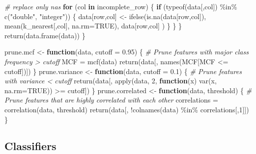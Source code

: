 \documentclass[
]{article}
\newenvironment{Shaded}{\begin{snugshade}}{\end{snugshade}}
\newcommand{\AttributeTok}[1]{\textcolor[rgb]{0.77,0.63,0.00}{#1}}
\newcommand{\CommentTok}[1]{\textcolor[rgb]{0.56,0.35,0.01}{\textit{#1}}}
\newcommand{\ConstantTok}[1]{\textcolor[rgb]{0.00,0.00,0.00}{#1}}
\newcommand{\ControlFlowTok}[1]{\textcolor[rgb]{0.13,0.29,0.53}{\textbf{#1}}}
\newcommand{\DecValTok}[1]{\textcolor[rgb]{0.00,0.00,0.81}{#1}}
\newcommand{\FloatTok}[1]{\textcolor[rgb]{0.00,0.00,0.81}{#1}}
\newcommand{\FunctionTok}[1]{\textcolor[rgb]{0.00,0.00,0.00}{#1}}
\newcommand{\NormalTok}[1]{#1}
\newcommand{\OtherTok}[1]{\textcolor[rgb]{0.56,0.35,0.01}{#1}}
\newcommand{\SpecialCharTok}[1]{\textcolor[rgb]{0.00,0.00,0.00}{#1}}
\newcommand{\StringTok}[1]{\textcolor[rgb]{0.31,0.60,0.02}{#1}}
\begin{document}
\begin{Shaded}
\begin{Highlighting}[]
        \CommentTok{\# replace only na\textquotesingle{}s}
        \ControlFlowTok{for}\NormalTok{ (col }\ControlFlowTok{in}\NormalTok{ incomplete\_row) \{}
            \ControlFlowTok{if}\NormalTok{ (}\FunctionTok{typeof}\NormalTok{(data[,col]) }\SpecialCharTok{\%in\%} \FunctionTok{c}\NormalTok{(}\StringTok{"double"}\NormalTok{, }\StringTok{"integer"}\NormalTok{)) \{}
\NormalTok{                data[row,col] }\OtherTok{\textless{}{-}} \FunctionTok{ifelse}\NormalTok{(}\FunctionTok{is.na}\NormalTok{(data[row,col]),}
                    \FunctionTok{mean}\NormalTok{(k\_nearest[,col], }\AttributeTok{na.rm=}\ConstantTok{TRUE}\NormalTok{),}
\NormalTok{                    data[row,col]}
\NormalTok{                )}
\NormalTok{            \}}
\NormalTok{        \}}
\NormalTok{    \}}
    \FunctionTok{return}\NormalTok{(}\FunctionTok{data.frame}\NormalTok{(data))}
\NormalTok{\}}

\NormalTok{prune.mcf }\OtherTok{\textless{}{-}} \ControlFlowTok{function}\NormalTok{(data, }\AttributeTok{cutoff =} \FloatTok{0.95}\NormalTok{) \{}
    \CommentTok{\#\textquotesingle{} Prune features with major class frequency \textgreater{} cutoff}
\NormalTok{    MCF }\OtherTok{=} \FunctionTok{mcf}\NormalTok{(data)}
    \FunctionTok{return}\NormalTok{(data[, }\FunctionTok{names}\NormalTok{(MCF[MCF }\SpecialCharTok{\textless{}=}\NormalTok{ cutoff])])}
\NormalTok{\}}
\NormalTok{prune.variance }\OtherTok{\textless{}{-}} \ControlFlowTok{function}\NormalTok{(data, }\AttributeTok{cutoff =} \FloatTok{0.1}\NormalTok{) \{}
    \CommentTok{\#\textquotesingle{} Prune features with variance \textless{} cutoff}
    \FunctionTok{return}\NormalTok{(data[, }\FunctionTok{apply}\NormalTok{(data, }\DecValTok{2}\NormalTok{, }\ControlFlowTok{function}\NormalTok{(x) }\FunctionTok{var}\NormalTok{(x, }\AttributeTok{na.rm=}\ConstantTok{TRUE}\NormalTok{)) }\SpecialCharTok{\textgreater{}=}\NormalTok{ cutoff])}
\NormalTok{\}}
\NormalTok{prune.correlated }\OtherTok{\textless{}{-}} \ControlFlowTok{function}\NormalTok{(data, threshold) \{}
    \CommentTok{\#\textquotesingle{} Prune features that are highly correlated with each other}
\NormalTok{    correlations }\OtherTok{=} \FunctionTok{correlation}\NormalTok{(data, threshold)}
    \FunctionTok{return}\NormalTok{(data[, }\SpecialCharTok{!}\FunctionTok{colnames}\NormalTok{(data) }\SpecialCharTok{\%in\%}\NormalTok{ correlations[,}\DecValTok{1}\NormalTok{]])}
\NormalTok{\}}
\end{Highlighting}
\end{Shaded}

\hypertarget{classifiers}{%
\subsection{Classifiers}\label{classifiers}}
\end{document}
